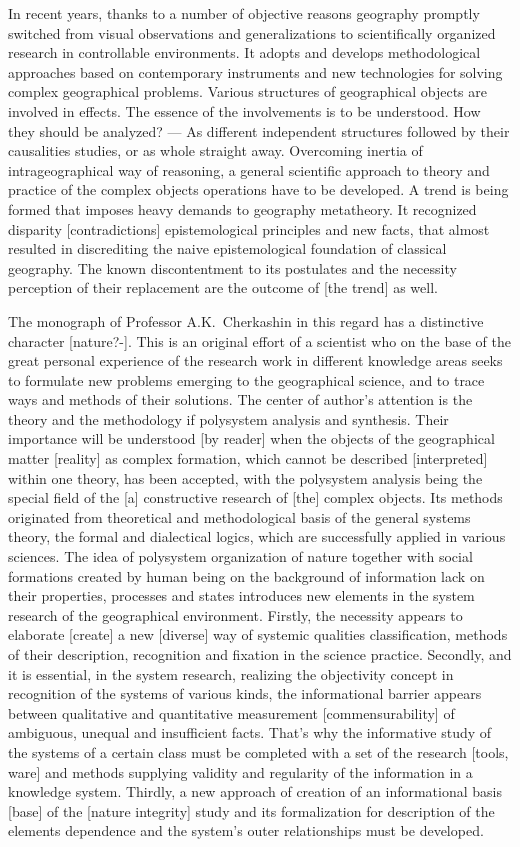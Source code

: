 \documentclass[12pt,leqno]{book}
\begin{document}
In recent years, thanks to a number of objective reasons geography promptly switched from visual observations and generalizations to scientifically organized research in controllable environments. It adopts and develops methodological approaches based on contemporary instruments and new technologies for solving complex geographical problems. Various structures of geographical objects are involved in effects. The essence of the involvements is to be understood. How they should be analyzed? --- As different independent structures followed by their causalities studies, or as whole straight away. Overcoming inertia of intrageographical way of reasoning, a general scientific approach to theory and practice of the complex objects operations have to be developed. A trend is being formed that imposes heavy demands to geography metatheory. It recognized disparity [contradictions] epistemological principles and new facts, that almost resulted in discrediting the naive epistemological foundation of classical geography. The known discontentment to its postulates and the necessity perception of their replacement are the outcome of [the trend] as well.

The monograph of Professor A.K.~Cherkashin in this regard has a distinctive character [nature?-]. This is an original effort of a scientist who on the base of the great personal experience of the research work in different knowledge areas seeks to formulate new problems emerging to the geographical science, and to trace ways and methods of their solutions. The center of author's attention is the theory and the methodology if polysystem analysis and synthesis. Their importance will be understood [by reader] when the objects of the geographical matter [reality] as complex formation, which cannot be described [interpreted] within one theory, has been accepted, with the polysystem analysis being the special field of the [a] constructive research of [the] complex objects. Its methods originated from theoretical and methodological basis of the general systems theory, the formal and dialectical logics, which are successfully applied in various sciences. The idea of polysystem organization of nature together with social formations created by human being on the background of information lack on their properties, processes and states introduces new elements in the system research of the geographical environment. Firstly, the necessity appears to elaborate [create] a new [diverse] way of systemic qualities classification, methods of their description, recognition and fixation in the science practice. Secondly, and it is essential, in the system research, realizing the objectivity concept in recognition of the systems of various kinds, the informational barrier appears between qualitative and quantitative measurement [commensurability] of ambiguous, unequal and insufficient facts. That's why the informative study of the systems of a certain class must be completed with a set of the research [tools, ware] and methods supplying validity and regularity of the information in a knowledge system. Thirdly, a new approach of creation of an informational basis [base] of the [nature integrity] study and its formalization for description of the elements dependence and the system's outer relationships must be developed.
\end{document}

